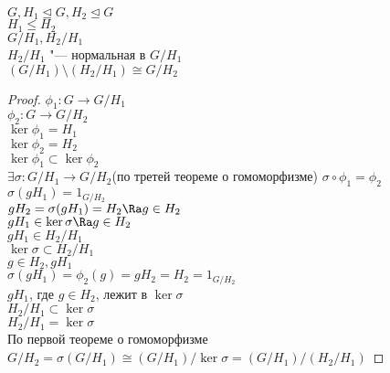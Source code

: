 \begin{theorem}
$G, H_1 \unlhd G, H_2 \unlhd G$\\
$H_1 \le H_2$\\
$G/H_1, H_2 / H_1$\\
$H_2 / H_1$  "--- нормальная в $G / H_1$\\
$(G / H_1)\setminus(H_2 / H_1) \cong G / H_2$\\
\end{theorem}
\begin{proof}
$\phi_1 \colon G \to G / H_1$\\
$\phi_2 \colon G \to G / H_2$\\
$\ker \phi_1 = H_1$\\
$\ker \phi_2 = H_2$\\
$\ker \phi_1 \subset \ker \phi_2$\\
$\exists \sigma \colon G / H_1 \to G / H_2$(по третей теореме о гомоморфизме)
$\sigma \circ \phi_1 = \phi_2$\\
$\sigma(gH_1) = 1_{G / H_2}$\\
$gH_2 = \sigma(gH_1) = H_2 \Ra g \in H_2$\\

$gH_1 \in \ker \sigma \Ra g \in H_2$\\
$gH_1 \in H_2 / H_1$\\
$\ker \sigma \subset H_2 / H_1$\\

$g \in H_2, gH_1$\\
$\sigma(gH_1) = \phi_2(g) = gH_2 = H_2 = 1_{G/ H_2}$\\
$gH_1$, где $g \in H_2$, лежит в $\ker \sigma$\\
$H_2 / H_1 \subset \ker \sigma$\\
$H_2 / H_1 = \ker \sigma$\\

По первой теореме о гомоморфизме 
$G / H_2 = \sigma (G / H_1) \cong (G / H_1)/ \ker \sigma = (G/ H_1)/(H_2 / H_1)$

\end{proof}
